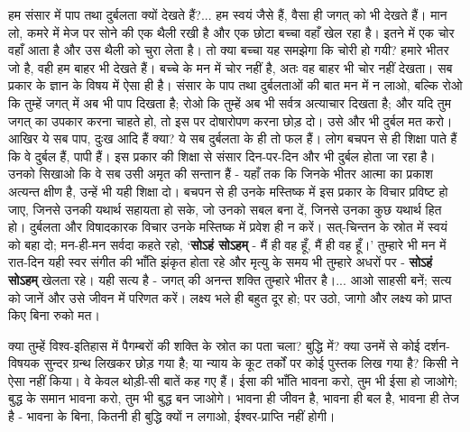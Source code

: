 हम संसार में पाप तथा दुर्बलता क्यों देखते हैं?... हम स्वयं जैसे हैं, वैसा ही जगत् को भी देखते हैं। मान लो, कमरे में मेज पर सोने की एक थैली रखी है और एक छोटा बच्चा वहाँ खेल रहा है। इतने में एक चोर वहाँ आता है और उस थैली को चुरा लेता है। तो क्या बच्चा यह समझेगा कि चोरी हो गयी? हमारे भीतर जो है, वही हम बाहर भी देखते हैं। बच्चे के मन में चोर नहीं है, अतः वह बाहर भी चोर नहीं देखता। सब प्रकार के ज्ञान के विषय में ऐसा ही है। संसार के पाप तथा दुर्बलताओं की बात मन में न लाओ, बल्कि रोओ कि तुम्हें जगत् में अब भी पाप दिखता है; रोओ कि तुम्हें अब भी सर्वत्र अत्याचार दिखता है; और यदि तुम जगत् का उपकार करना चाहते हो, तो इस पर दोषारोपण करना छोड़ दो। उसे और भी दुर्बल मत करो। आखिर ये सब पाप, दुःख आदि हैं क्या? ये सब दुर्बलता के ही तो फल हैं। लोग बचपन से ही शिक्षा पाते हैं कि वे दुर्बल हैं, पापी हैं। इस प्रकार की शिक्षा से संसार दिन-पर-दिन और भी दुर्बल होता जा रहा है। उनको सिखाओ कि वे सब उसी अमृत की सन्तान हैं - यहाँ तक कि जिनके भीतर आत्मा का प्रकाश अत्यन्त क्षीण है, उन्हें भी यही शिक्षा दो। बचपन से ही उनके मस्तिष्क में इस प्रकार के विचार प्रविष्ट हो जाए, जिनसे उनकी यथार्थ सहायता हो सके, जो उनको सबल बना दें, जिनसे उनका कुछ यथार्थ हित हो। दुर्बलता और विषादकारक विचार उनके मस्तिष्क में प्रवेश ही न करें। सत्-चिन्तन के स्रोत में स्वयं को बहा दो; मन-ही-मन सर्वदा कहते रहो, ‘\textbf{सोऽहं सोऽहम् }- मैं ही वह हूँ, मैं ही वह हूँ।’ तुम्हारे भी मन में रात-दिन यही स्वर संगीत की भाँति झंकृत होता रहे और मृत्यु के समय भी तुम्हारे अधरों पर - \textbf{सोऽहं सोऽहम् } खेलता रहे। यही सत्य है - जगत् की अनन्त शक्ति तुम्हारे भीतर है।... आओ साहसी बनें; सत्य को जानें और उसे जीवन में परिणत करें। लक्ष्य भले ही बहुत दूर हो; पर उठो, जागो और लक्ष्य को प्राप्त किए बिना रुको मत। 

क्या तुम्हें विश्व-इतिहास में पैगम्बरों की शक्ति के स्रोत का पता चला? बुद्धि में? क्या उनमें से कोई दर्शन-विषयक सुन्दर ग्रन्थ लिखकर छोड़ गया है; या न्याय के कूट तर्कों पर कोई पुस्तक लिख गया है? किसी ने ऐसा नहीं किया। वे केवल थोड़ी-सी बातें कह गए हैं। ईसा की भाँति भावना करो, तुम भी ईसा हो जाओगे; बुद्ध के समान भावना करो, तुम भी बुद्ध बन जाओगे। भावना ही जीवन है, भावना ही बल है, भावना ही तेज है - भावना के बिना, कितनी ही बुद्धि क्यों न लगाओ, ईश्वर-प्राप्ति नहीं होगी। 

